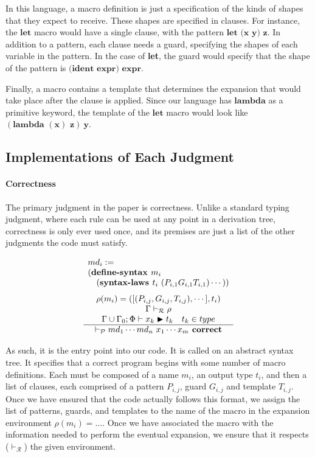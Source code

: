 \documentclass[11pt]{article}
\begin{document}
In this language, a macro definition is just a specification of the kinds of shapes that they expect to receive. These shapes are specified in clauses. For instance, the $\textbf{let}$ macro would have a single clause, with the pattern $\textbf{let (x y) z}$. In addition to a pattern, each clause needs a guard, specifying the shapes of each variable in the pattern. In the case of \textbf{let}, the guard would specify that the shape of the pattern is $\textbf{(ident expr) expr}$. 

Finally, a macro contains a template that determines the expansion that would take place after the clause is applied. Since our language has $\textbf{lambda}$ as a primitive keyword, the template of the $\textbf{let}$ macro would look like $(\textbf{lambda }(\textbf{x})\textbf{ z})\ \textbf{y}$.


\subsection{Implementations of Each Judgment}

\paragraph{Correctness} The primary judgment in the paper is correctness. Unlike a standard typing judgment, where each rule can be used at any point in a derivation tree, correctness is only ever used once, and its premises are just a list of the other judgments the code must satisfy. 

\[\begin{array}{c}
\multicolumn{1}{l}{md_i :=}\\
\multicolumn{1}{l}{(\textbf{define-syntax } m_i} \\\quad(\textbf{syntax-laws }t_i\ (P_{i,1}G_{i,1}T_{i,1}) \cdots)) \\[0.25cm]
\rho(m_i)=([(P_{i,j},G_{i,j},T_{i,j}), \cdots], t_i)\\
\Gamma \vdash_{\mathcal R} \rho \\
\Gamma \cup \Gamma_0;\Phi \vdash x_k \blacktriangleright t_k\quad t_k 
\in type \\\hline
\vdash_\mathcal P md_1 \cdots md_n \ x_1 \cdots x_{m} \textbf{ correct}\\
\end{array}\\[0.5cm]\]

As such, it is the entry point into our code. It is called on an abstract syntax tree. It specifies that a correct program begins with some number of macro definitions. Each must be composed of a name $m_i$, an output type $t_i$, and then a list of clauses, each comprised of a pattern $P_{i,j}$, guard $G_{i,j}$ and template $T_{i,j}$. Once we have ensured that the code actually follows this format, we assign the list of patterns, guards, and templates to the name of the macro in the expansion environment $\rho(m_i) = \dots$. Once we have associated the macro with the information needed to perform the eventual expansion, we ensure that it respects ($\vdash _\mathcal{R}$) the given environment. 
\end{document}
